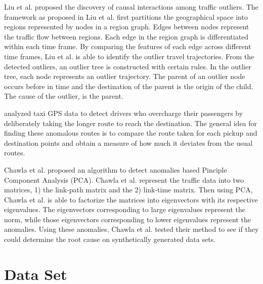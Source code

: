 \documentclass[10pt]{article}
\begin{document}
Liu et al. \cite{Liu2011} proposed the discovery of causal interactions among traffic outliers. The framework as proposed in Liu et al.\cite{Liu2011} first partitions the geographical space into regions represented by nodes in a region graph. Edges between nodes represent the traffic flow between regions. Each edge in the region graph is differentiated within each time frame. By comparing the features of each edge across different time frames, Liu et al. is able to identify the outlier travel trajectories. From the detected outliers, an outlier tree is constructed with certain rules. In the outlier tree, each node represents an outlier trajectory. The parent of an outlier node occurs before in time and the destination of the parent is the origin of the child. The cause of the outlier, is the parent.


\cite{Ge2011,Zhang2011,Zhang2012} analyzed taxi GPS data to detect drivers who overcharge their passengers by deliberately taking the longer route to reach the destination. The general idea for finding these anomalous routes is to compare the route taken for each pickup and destination points and obtain a measure of how much it deviates from the usual routes.

Chawla et al. \cite{Chawla2012} proposed an algorithm to detect anomalies based Pinciple Component Analysis (PCA). Chawla et al. \cite{Chawla2012} represent the traffic data into two matrices, 1) the link-path matrix and the 2) link-time matrix. Then using PCA, Chawla et al. \cite{Chawla2012} is able to factorize the matrices into eigenvectors with its respective eigenvalues. The eigenvectors corresponding to large eigenvalues represent the norm, while those eigenvectors corresponding to lower eigenvalues represent the anomalies. Using these anomalies, Chawla et al. \cite{Chawla2012} tested their method to see if they could determine the root cause on synthetically generated data sets.

\section{Data Set}
\end{document}
